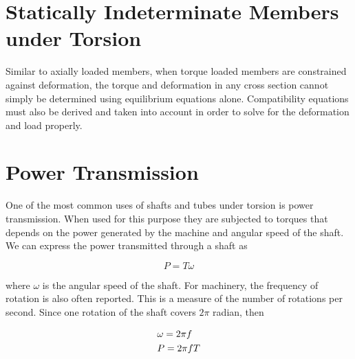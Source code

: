 \documentclass[
fontsize=10pt,
a4paper,
twosides=false,
open=any,
svgnames,
]{kaobook} %
\begin{document}
\section{Statically Indeterminate Members under Torsion}

Similar to axially loaded members, when torque loaded members are constrained against deformation, the torque and deformation in any cross section cannot simply be determined using equilibrium equations alone. Compatibility equations must also be derived and taken into account in order to solve for the deformation and load properly.

\section{Power Transmission}

One of the most common uses of shafts and tubes under torsion is power transmission. When used for this purpose they are subjected to torques that depends on the power generated by the machine and angular speed of the shaft. We can express the power transmitted through a shaft as

\begin{equation}
  P = T\omega
\end{equation}

where $\omega$  is the angular speed of the shaft. For machinery, the frequency of rotation is also often reported. This is a measure of the number of rotations per second. Since one rotation of the shaft covers $2\pi$ radian, then

\begin{equation} \label{eqn: power-torque}
  \begin{gathered}
    \omega  = 2\pi f \hfill \\
    P = 2\pi fT \hfill \\ 
  \end{gathered}
\end{equation}
\end{document}
